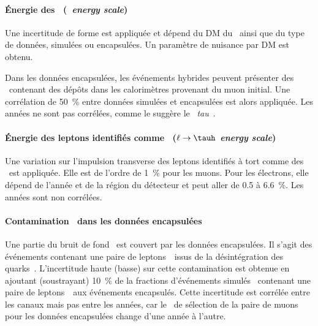 \paragraph{Énergie des \tauh\ (\emph{\tauh\ energy scale})}
Une incertitude de forme est appliquée et dépend du DM du \tauh\ ainsi que du type de données, simulées ou encapsulées.
Un paramètre de nuisance par DM est obtenu.
\par
Dans les données encapsulées, les événements hybrides peuvent présenter des \tauh\ contenant des dépôts dans les calorimètres provenant du muon initial.
Une corrélation de \SI{50}{\%} entre données simulées et encapsulées est alors appliquée.
Les années ne sont pas corrélées, comme le suggère le \POG\ \emph{tau}~\cite{TauPOG}.
\paragraph{Énergie des leptons identifiés comme \tauh\ (\emph{$\ell\to\tauh$ energy scale})}
Une variation sur l'impulsion transverse des leptons identifiés à tort comme des \tauh\ est appliquée.
Elle est de l'ordre de \SI{1}{\%} pour les muons.
Pour les électrons, elle dépend de l'année et de la région du détecteur et peut aller de \num{0.5} à \SI{6.6}{\%}.
Les années sont non corrélées.
\paragraph{Contamination \ttbar\ dans les données encapsulées}
Une partie du bruit de fond \ttbar\ est couvert par les données encapsulées.
Il s'agit des événements contenant une paire de leptons~\tau\ issus de la désintégration des quarks~\quarkt.
L'incertitude haute (basse) sur cette contamination est obtenue en ajoutant (soustrayant) \SI{10}{\%} de la fractions d'événements simulés \ttbar\ contenant une paire de leptons~\tau\ aux événements encapsulés.
Cette incertitude est corrélée entre les canaux mais pas entre les années, car le \HLTpath\ de sélection de la paire de muons pour les données encapsulées change d'une année à l'autre.
